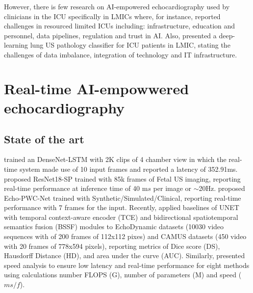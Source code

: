 \documentclass[mlabstract,twocolumn]{jmlr}
\begin{document}
However, there is few research on AI-empowered echocardiography used by clinicians in the ICU specifically in LMICs where, for instance, \cite{2021-huyNhat-vanHao-in-FAIR-MICCAI} reported challenges in resourced limited ICUs including: infrastructure, education and personnel, data pipelines, regulation and trust in AI.
Also, \cite{2021-kerdegari-Applied-Sciences-MDPI, 2021-kerdegari-ISBI-IEEE, 2021-huyNhat-kerdegari-in-FAIR-MICCAI} presented a deep-learning lung US pathology classifier for ICU patients in LMIC, stating the challenges of data imbalance, integration of technology and IT infrastructure.

\section{Real-time AI-empowwered echocardiography}
\subsection{State of the art}  \label{subsec:State_of_the_art}
\citet{woudenberg2018} trained an DenseNet-LSTM with 2K clips of 4 chamber view in which the real-time system made use of 10 input frames and reported a latency of 352.91ms.
\citet{toussaint2018-MICCAI} proposed ResNet18-SP trained with 85k frames of Fetal US imaging, reporting real-time performance at inference time of 40 m$s$ per image or $\sim$20Hz.
\citet{ostvik2021-TMI} proposed Echo-PWC-Net trained with Synthetic/Simulated/Clinical, reporting real-time performance with 7 frames for the input.
Recently, \citet{wu2022} applied baselines of UNET with temporal context-aware encoder (TCE) and bidirectional spatiotemporal semantics fusion (BSSF) modules to EchoDynamic datasets (10030 video sequences with of 200 frames of 112x112 pixes) and CAMUS datasets  (450 video with 20 frames of 778x594 pixels), reporting metrics of Dice score (DS), Hausdorff Distance (HD), and area under the curve (AUC).
Similarly, \citet{wu2022} presented speed analysis to ensure low latency and real-time performance for eight methods using calculations number FLOPS (G), number of parameters (M) and speed ($ms/f$).
\end{document}
